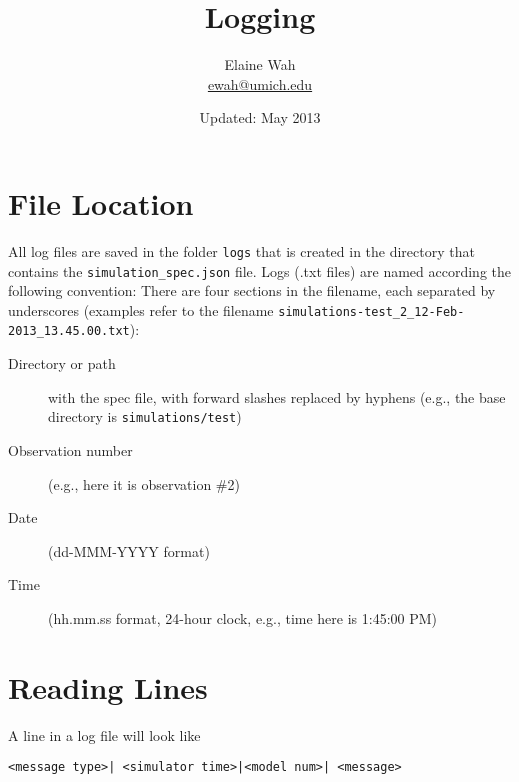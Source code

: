 \documentclass[11pt]{article}
\begin{document}
	
\title{Logging}
\author{
  Elaine Wah \\
  \href{mailto:ewah@umich.edu}{ewah@umich.edu}
}
\date{Updated: May 2013}
\maketitle

\section{File Location}

All log files are saved in the folder \texttt{logs} that is created in the
directory that contains the \texttt{simulation\_spec.json} file.  Logs (.txt
files) are named according the following convention: There are four sections in
the filename, each separated by underscores (examples refer to the filename
\texttt{simulations-test\_2\_12-Feb-2013\_13.45.00.txt}):

\begin{description}
\item[Directory or path] with the spec file, with forward slashes replaced by
  hyphens (e.g., the base directory is \texttt{simulations/test})
\item[Observation number] (e.g., here it is observation \#2)
\item[Date] (dd-MMM-YYYY format)
\item[Time] (hh.mm.ss format, 24-hour clock, e.g., time here is 1:45:00 PM)
\end{description}

\section{Reading Lines}

A line in a log file will look like

\begin{verbatim}
<message type>| <simulator time>|<model num>| <message>
\end{verbatim}
\end{document}
